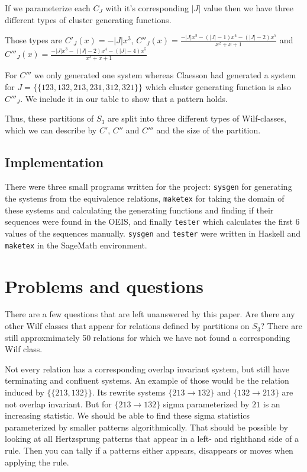 \documentclass[a4paper, 11pt, english]{article}
\newcommand{\patternrule}{ \to \!}
\theoremstyle{definition}
\newcommand{\Sym}{S}
\begin{document}
If we parameterize each $C_J$ with it's corresponding $|J|$ value then we have
three different types of cluster generating functions.

Those types are $C'_J(x) = -|J|x^3$, $C''_J(x) = \frac{-|J|x^3-(|J|-1)x^4-(|J|-2)x^5}{x^2+x+1}$
and $C'''_J(x) = \frac{-|J|x^3-(|J|-2)x^4-(|J|-4)x^5}{x^2+x+1}$

For $C'''$ we only generated one system whereas Claesson had generated a system for
$J = \{\{ 123, 132, 213, 231, 312, 321 \}\}$ which cluster generating function
is also $C'''_J$. We include it in our table to show that a pattern holds.

Thus, these partitions of $\Sym_3$ are split into three different types
of Wilf-classes, which we can describe by $C'$, $C''$ and $C'''$ and the size
of the partition.

\subsection{Implementation}
There were three small programs \cite{hartjenstein:2021} written for the project: \verb|sysgen| for generating the
systems from the equivalence relations, \verb|maketex| for taking the domain of these
systems and calculating the generating functions and finding if their sequences
were found in the OEIS, and finally \verb|tester| which calculates the first 6 values
of the sequences manually. \verb|sysgen| and \verb|tester| were written in Haskell and
\verb|maketex| in the SageMath environment. 

\section{Problems and questions}

There are a few questions that are left unanswered by this paper.
Are there any other Wilf classes that appear for relations defined by partitions on $\Sym_3$? There are
still approxmimately 50 relations for which we have not found a corresponding Wilf class. 

Not every relation has a corresponding overlap invariant system, but still have terminating and
confluent systems. An example of those would be the relation induced by $\{ \{ 213, 132
\} \}$. Its rewrite systems ${\{ 213 \patternrule 132 \}}$ and ${\{
132 \patternrule 213 \}}$ are not overlap invariant. 
But for $\{ 213 \patternrule 132 \}$ sigma parameterized by $21$ is an increasing statistic. We
should be able to find these sigma statistics parameterized by smaller patterns algorithmically.
That should be possible by looking at all Hertzsprung patterns that appear in a left- and righthand
side of a rule. Then you can tally if a patterns either appears, disappears or moves when applying the rule.
\end{document}
